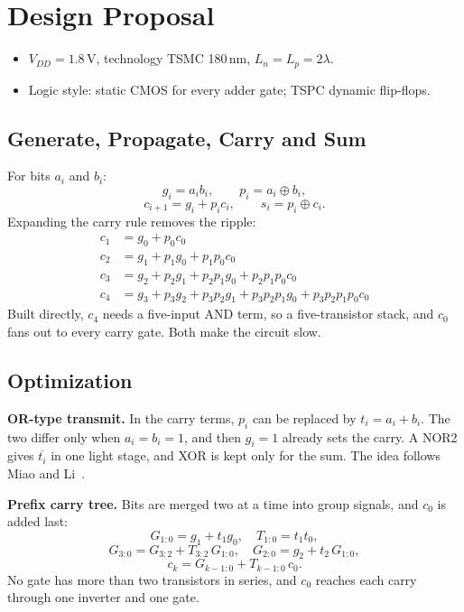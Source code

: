 \documentclass[conference,a4paper]{IEEEtran}
\begin{document}
\section{Design Proposal}
\begin{itemize}
\item $V_{DD} = 1.8$\,V, technology TSMC 180\,nm, $L_n = L_p = 2\lambda$.
\item Logic style: static CMOS for every adder gate; TSPC dynamic flip-flops.
\end{itemize}
\subsection{Generate, Propagate, Carry and Sum}
For bits $a_i$ and $b_i$:
\[ g_i = a_i b_i, \qquad p_i = a_i \oplus b_i, \]
\[ c_{i+1} = g_i + p_i c_i, \qquad s_i = p_i \oplus c_i . \]
Expanding the carry rule removes the ripple:
\begin{align*}
c_1 &= g_0 + p_0 c_0\\
c_2 &= g_1 + p_1 g_0 + p_1 p_0 c_0\\
c_3 &= g_2 + p_2 g_1 + p_2 p_1 g_0 + p_2 p_1 p_0 c_0\\
c_4 &= g_3 + p_3 g_2 + p_3 p_2 g_1 + p_3 p_2 p_1 g_0 + p_3 p_2 p_1 p_0 c_0
\end{align*}
Built directly, $c_4$ needs a five-input AND term, so a five-transistor stack, and $c_0$ fans out to every carry gate. Both make the circuit slow.

\subsection{Optimization}
\textbf{OR-type transmit.} In the carry terms, $p_i$ can be replaced by $t_i = a_i + b_i$. The two differ only when $a_i = b_i = 1$, and then $g_i = 1$ already sets the carry. A NOR2 gives $\overline{t_i}$ in one light stage, and XOR is kept only for the sum. The idea follows Miao and Li~\cite{miao}.

\textbf{Prefix carry tree.} Bits are merged two at a time into group signals, and $c_0$ is added last:
\[ G_{1:0} = g_1 + t_1 g_0, \quad T_{1:0} = t_1 t_0, \]
\[ G_{3:0} = G_{3:2} + T_{3:2}\,G_{1:0}, \quad G_{2:0} = g_2 + t_2\,G_{1:0}, \]
\[ c_k = G_{k-1:0} + T_{k-1:0}\, c_0 . \]
No gate has more than two transistors in series, and $c_0$ reaches each carry through one inverter and one gate.
\end{document}
